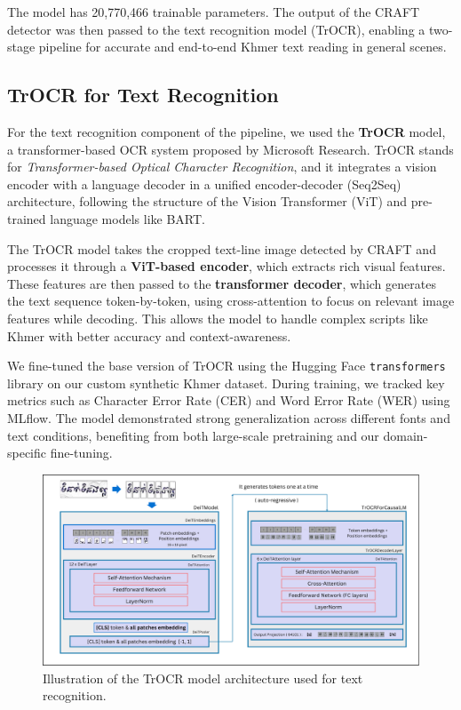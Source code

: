 The model has 20,770,466 trainable parameters. The output of the CRAFT detector was then passed to the text recognition 
model (TrOCR), enabling a two-stage pipeline for accurate and end-to-end 
Khmer text reading in general scenes.

\subsection{TrOCR for Text Recognition}
\label{subsec:trocr}

For the text recognition component of the pipeline, we used the \textbf{TrOCR} model, 
a transformer-based OCR system proposed by Microsoft Research. TrOCR stands for 
\textit{Transformer-based Optical Character Recognition}, and it integrates a vision 
encoder with a language decoder in a unified encoder-decoder (Seq2Seq) architecture, 
following the structure of the Vision Transformer (ViT) and pre-trained language models 
like BART.

The TrOCR model takes the cropped text-line image detected by CRAFT and processes it through a \textbf{ViT-based encoder}, which extracts rich visual features. These features are then passed to the \textbf{transformer decoder}, which generates the text sequence token-by-token, using cross-attention to focus on relevant image features while decoding. This allows the model to handle complex scripts like Khmer with better accuracy and context-awareness.

We fine-tuned the base version of TrOCR using the Hugging Face \texttt{transformers} library on our custom synthetic Khmer dataset. During training, we tracked key metrics such as Character Error Rate (CER) and Word Error Rate (WER) using MLflow. The model demonstrated strong generalization across different fonts and text conditions, benefiting from both large-scale pretraining and our domain-specific fine-tuning.

\begin{figure}[H]
    \centering
    \includegraphics[width=\textwidth]{figures/trocr_model.png}
    \caption{Illustration of the TrOCR model architecture used for text recognition.}
    \label{fig:trocr-model}
\end{figure}

